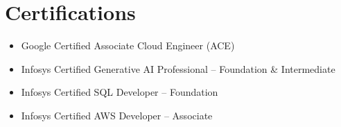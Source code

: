 \documentclass[a4paper,11pt]{article}
\begin{document}
\vspace{6pt}

\section*{Certifications}
\begin{itemize}
    \item Google Certified Associate Cloud Engineer (ACE)
    \item Infosys Certified Generative AI Professional – Foundation \& Intermediate
    \item Infosys Certified SQL Developer – Foundation
    \item Infosys Certified AWS Developer – Associate
\end{itemize}
\end{document}
